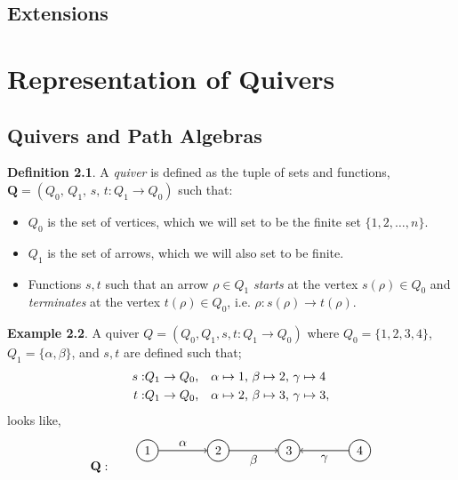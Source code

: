 \documentclass[11.5pt, twoside, a4paper, titlepage]{report}
\providecommand{\equ}[0]{\begin{equation*}}
\providecommand{\eequ}[0] {\end{equation*}}
\theoremstyle{definition}
\newtheorem{mydef}{Definition}[section]
\newtheorem{eg}[mydef]{Example}
\theoremstyle{plain}
\begin{document}
\section{Extensions}










\chapter{Representation of Quivers}

\section{Quivers and Path Algebras}

\begin{mydef}
A \emph{quiver} is defined as the tuple of sets and functions, $\mathbf{Q}=(Q_0\text{, }Q_1\text{, }s\text{, }t: Q_1 \to Q_0)$ such that:
\begin{itemize}
\item $Q_0$ is the set of vertices, which we will set to be the finite set $\{1, 2, \dots, n\}$.
\item $Q_1$ is the set of arrows, which we will also set to be finite.
\item Functions $s, t$ such that an arrow $\rho \in Q_1$ \emph{starts} at the vertex $s(\rho)\in Q_0$ and \emph{terminates} at the vertex $t(\rho)\in Q_0$, i.e. $\rho: s(\rho) \to t(\rho)$.
\end{itemize}
\end{mydef}

\begin{eg} \label{ininquivereg}
A quiver $Q=(Q_0, Q_1, s, t:Q_1 \to Q_0)$ where $Q_0=\{1, 2, 3, 4\}$, $Q_1=\{\alpha, \beta\}$, and $s, t$ are defined such that;
\begin{align*}
s:& Q_1 \to Q_0\text{,\quad} \alpha \mapsto 1\text{, } \beta \mapsto 2\text{, } \gamma \mapsto 4\\
t:& Q_1 \to Q_0\text{,\quad} \alpha \mapsto 2\text{, } \beta \mapsto 3\text{, } \gamma \mapsto 3,
\end{align*}
looks like,
\equ
\mathbf{Q}: \qquad
\begin{tikzpicture}[->,-latex, auto, every path/.style={->, semithick}, main node/.style={draw, circle}]
\node	[main node]		(1) at (0,0)		{1};
\node	[main node]		(2) at (2,0)		{2};
\node	[main node]		(3) at (4,0)		{3};
\node [main node]		(4) at (6,0)		{4};

\draw (1) edge node [auto] {$\alpha$} (2);
\draw (2) edge node [auto, swap] {$\beta$} (3);
\draw (4) edge node [auto] {$\gamma$} (3);
\end{tikzpicture}
\eequ
\end{eg}
\end{document}
